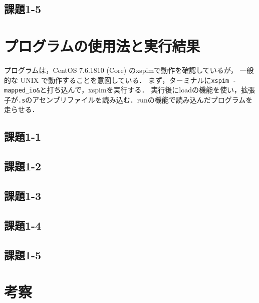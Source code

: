 \subsection{課題1-5}



\section{プログラムの使用法と実行結果}\label{sec:howresult}

プログラムは，CentOS 7.6.1810 (Core) のxspimで動作を確認しているが，
一般的な UNIX で動作することを意図している．
まず，ターミナルに\verb|xspim -mapped_io&|と打ち込んで，xspimを実行する．
実行後にloadの機能を使い，拡張子が\verb|.s|のアセンブリファイルを読み込む．runの機能で読み込んだプログラムを走らせる．


\subsection{課題1-1}


\subsection{課題1-2}


\subsection{課題1-3}


\subsection{課題1-4}


\subsection{課題1-5}


\section{考察} \label{sec:review}

